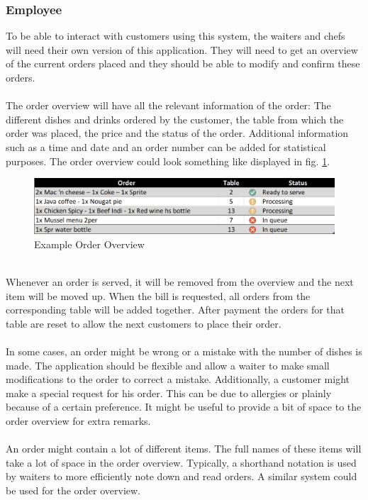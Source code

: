 \documentclass[12pt]{article}
\begin{document}
\subsubsection{Employee}
To be able to interact with customers using this system, the waiters and chefs will need their own version of this application. They will need to get an overview of the current orders placed and they should be able to modify and confirm these orders.
\\\\
The order overview will have all the relevant information of the order: The different dishes and drinks ordered by the customer, the table from which the order was placed, the price and the status of the order. Additional information such as a time and date and an order number can be added for statistical purposes.
The order overview could look something like displayed in fig. \ref{fig:orderview}.
\begin{figure}[h!]
	\includegraphics[width=\linewidth]{orderview.PNG}
	\caption{Example Order Overview}
	\label{fig:orderview}
\end{figure}
\\
Whenever an order is served, it will be removed from the overview and the next item will be moved up. When the bill is requested, all orders from the corresponding table will be added together. After payment the orders for that table are reset to allow the next customers to place their order.
\\\\
In some cases, an order might be wrong or a mistake with the number of dishes is made. The application should be flexible and allow a waiter to make small modifications to the order to correct a mistake.
Additionally, a customer might make a special request for his order. This can be due to allergies or plainly because of a certain preference. It might be useful to provide a bit of space to the order overview for extra remarks.
\\\\
An order might contain a lot of different items. The full names of these items will take a lot of space in the order overview. Typically, a shorthand notation is used by waiters to more efficiently note down and read orders. A similar system could be used for the order overview.
\end{document}
